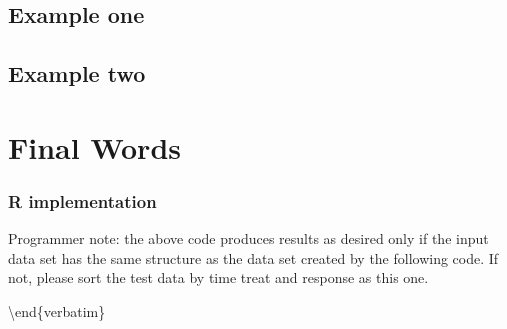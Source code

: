 \documentclass[]{book}
\begin{document}
\section{Example one}\label{example-one}

\section{Example two}\label{example-two}

\chapter{Final Words}\label{final-words}

\subsection{R implementation}\label{r-implementation}

Programmer note: the above code produces results as desired only if the
input data set has the same structure as the data set created by the
following code. If not, please sort the test data by time treat and
response as this one.

\textbackslash{}end\{verbatim\}


\end{document}
